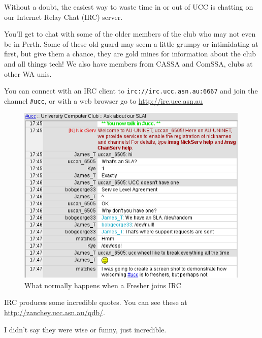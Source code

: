 \begin{mdframed}
\null
Without a doubt, the easiest way to waste time in or out of UCC 
is chatting on our Internet Relay Chat (IRC) server. 

You'll get to chat with some of the older members of the club who 
may not even be in Perth. Some of these old guard may seem a 
little grumpy or intimidating at first, but give them a chance, they 
are gold mines for information about the club and all things tech! 
We also have members from CASSA and ComSSA, clubs at other WA unis. 

You can connect with an IRC client to \texttt{irc://irc.ucc.asn.au:6667} 
and join the channel \texttt{\#ucc}, or with a web browser go to 
\url{http://irc.ucc.asn.au}

\begin{figure}[H]
	\centering
	\includegraphics[width=0.99\textwidth]{figures/webirc2.png}
	\caption{What normally happens when a Fresher joins IRC}
	\label{webirc.jpg}
\end{figure}

IRC produces some incredible quotes. You can see these at \url{http://zanchey.ucc.asn.au/qdb/}.

I didn't say they were wise or funny, just incredible.

\end{mdframed}


